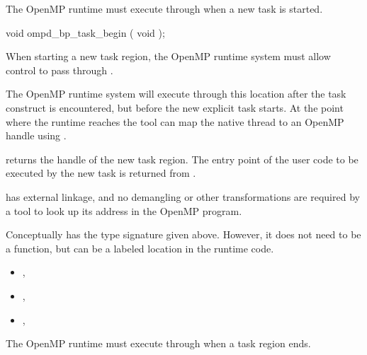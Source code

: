 \label{ompd:ompd_bp_task_begin}

The OpenMP runtime must execute through 
when a new task is started.


\cspecificstart
\begin{ompSyntax}
void ompd_bp_task_begin ( void );
\end{ompSyntax}
\cspecificend


\descr

When starting a new task region, the OpenMP runtime system
must allow control to pass through .

The OpenMP runtime system will execute through this location after the task
construct is encountered, but before the new explicit task starts.
At the point where the runtime reaches 
the tool can map the native thread to an OpenMP handle using
.

 returns the handle of the new task region.
The entry point of the user code to be executed by the new task
is returned from
.

\restrictions

 has external  linkage, and no
demangling or other transformations are required by a tool
to look up its address in the OpenMP program.

Conceptually  has the type signature
given above.
However, it does not need to be a function, but can be a labeled location
in the runtime code.

\crossreferences
\begin{itemize}
\item
  , 
\item
  , 
\item
  , 
\end{itemize}

\label{ompd:ompd_bp_task_end}

\summary
The OpenMP runtime must execute through 
when a task region ends.


